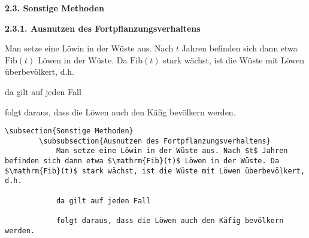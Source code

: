 \begin{frame}[fragile]
	\vspace{-0.2cm}\Losung
	\begin{outputbox}
	    { \Large\textbf{2.3. Sonstige Methoden}}
			
	    { \large\textbf{2.3.1. Ausnutzen des Fortpflanzungsverhaltens}}  
	
	    Man setze eine Löwin in der Wüste aus. Nach $t$ Jahren befinden sich dann etwa $\mathrm{Fib}(t)$ Löwen in der Wüste. Da $\mathrm{Fib}(t)$ stark wächst, ist die Wüste mit Löwen überbevölkert, d.h.
	
	    da gilt auf jeden Fall
	
	    folgt daraus, dass die Löwen auch den Käfig bevölkern werden.
		   \vspace{-0.1cm}
	\end{outputbox}

	\vspace{-0.2cm}\Code
	\begin{lstlisting}[gobble=4]
    \subsection{Sonstige Methoden}
	    \subsubsection{Ausnutzen des Fortpflanzungsverhaltens}
			Man setze eine Löwin in der Wüste aus. Nach $t$ Jahren befinden sich dann etwa $\mathrm{Fib}(t)$ Löwen in der Wüste. Da $\mathrm{Fib}(t)$ stark wächst, ist die Wüste mit Löwen überbevölkert, d.h.

		    da gilt auf jeden Fall

		    folgt daraus, dass die Löwen auch den Käfig bevölkern werden.
	\end{lstlisting}
\end{frame}
